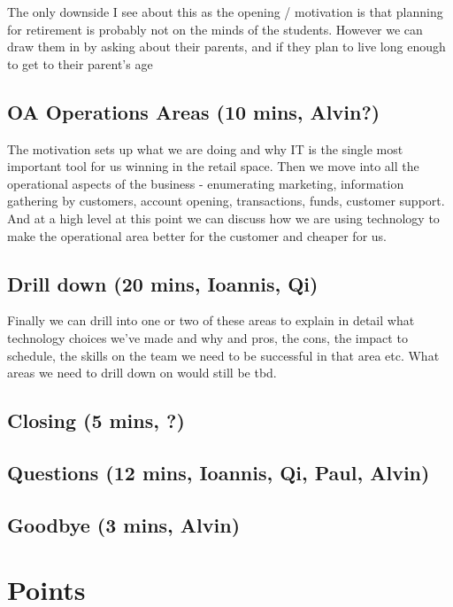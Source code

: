 \documentclass{article}
\begin{document}
The only downside I see about this as the opening / motivation is that planning for retirement is probably not on the minds of the students.  However we can draw them in by asking about their parents, and if they plan to live long enough to get to their parent's age

\subsection{OA Operations Areas (10 mins, Alvin?)}
The motivation sets up what we are doing and why IT is the single most important tool for us winning in the retail space.  Then we move into all the operational aspects of the business - enumerating marketing, information gathering by customers, account opening, transactions, funds, customer support.  And at a high level at this point we can discuss how we are using technology to make the operational area better for the customer and cheaper for us.

\subsection{Drill down (20 mins, Ioannis, Qi)}
Finally we can drill into one or two of these areas to explain in detail what technology choices we've made and why and pros, the cons, the impact to schedule, the skills on the team we need to be successful in that area etc.  What areas we need to drill down on would still be tbd.

\subsection{Closing (5 mins, ?)}

\subsection{Questions (12 mins, Ioannis, Qi, Paul, Alvin)}

\subsection{Goodbye (3 mins, Alvin)}
 
\pagebreak

\section{Points}
\end{document}
